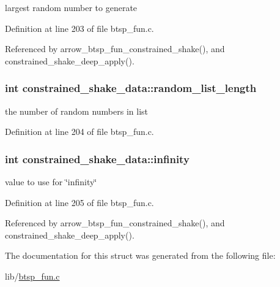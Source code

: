 largest random number to generate 

Definition at line 203 of file btsp\_\-fun.c.

Referenced by arrow\_\-btsp\_\-fun\_\-constrained\_\-shake(), and constrained\_\-shake\_\-deep\_\-apply().\hypertarget{structconstrained__shake__data_0114e4db38ea88cd199781d7ba97a44b}{
\subsubsection{\setlength{\rightskip}{0pt plus 5cm}int {\bf constrained\_\-shake\_\-data::random\_\-list\_\-length}}}
\label{structconstrained__shake__data_0114e4db38ea88cd199781d7ba97a44b}


the number of random numbers in list 

Definition at line 204 of file btsp\_\-fun.c.\hypertarget{structconstrained__shake__data_ba0c33ec57d7f977911088e41b48c606}{
\subsubsection{\setlength{\rightskip}{0pt plus 5cm}int {\bf constrained\_\-shake\_\-data::infinity}}}
\label{structconstrained__shake__data_ba0c33ec57d7f977911088e41b48c606}


value to use for \char`\"{}infinity\char`\"{} 

Definition at line 205 of file btsp\_\-fun.c.

Referenced by arrow\_\-btsp\_\-fun\_\-constrained\_\-shake(), and constrained\_\-shake\_\-deep\_\-apply().

The documentation for this struct was generated from the following file:\begin{CompactItemize}
\item 
lib/\hyperlink{btsp__fun_8c}{btsp\_\-fun.c}\end{CompactItemize}
